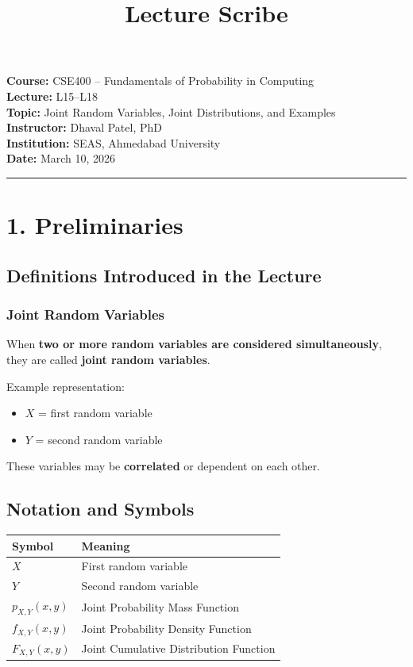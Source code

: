\documentclass[12pt]{article}
\title{Lecture Scribe}
\date{}
\begin{document}
\maketitle
\textbf{Course:} CSE400 – Fundamentals of Probability in Computing\\
\textbf{Lecture:} L15–L18\\
\textbf{Topic:} Joint Random Variables, Joint Distributions, and Examples\\
\textbf{Instructor:} Dhaval Patel, PhD\\
\textbf{Institution:} SEAS, Ahmedabad University\\
\textbf{Date:} March 10, 2026

\hrule
\vspace{0.5cm}

\section*{1. Preliminaries}

\subsection*{Definitions Introduced in the Lecture}

\subsubsection*{Joint Random Variables}

When \textbf{two or more random variables are considered simultaneously}, they are called \textbf{joint random variables}.

Example representation:

\begin{itemize}
\item $X$ = first random variable
\item $Y$ = second random variable
\end{itemize}

These variables may be \textbf{correlated} or dependent on each other.

\subsection*{Notation and Symbols}

\begin{center}
\begin{tabular}{ll}
\toprule
Symbol & Meaning \\
\midrule
$X$ & First random variable \\
$Y$ & Second random variable \\
$p_{X,Y}(x,y)$ & Joint Probability Mass Function \\
$f_{X,Y}(x,y)$ & Joint Probability Density Function \\
$F_{X,Y}(x,y)$ & Joint Cumulative Distribution Function \\
\bottomrule
\end{tabular}
\end{center}
\end{document}
